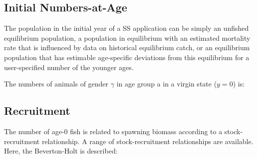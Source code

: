 \documentclass[11pt,
  english,
  letterpaper,
]{article}
\begin{document}
\leavevmode\tagmcend\tagstructend\par


\hypertarget{initial-numbers-at-age}{%
\subsection{Initial Numbers-at-Age}\label{initial-numbers-at-age}}

\leavevmode\tagmcend\tagstructend


The population in the initial year of a SS application can be simply an unfished equilibrium population, a population in equilibrium with an estimated mortality rate that is influenced by data on historical equilibrium catch, or an equilibrium population that has estimable age-specific deviations from this equilibrium for a user-specified number of the younger ages.

\leavevmode\tagmcend\tagstructend\par


The numbers of animals of gender {\(\gamma\)\leavevmode\tagmcend\tagstructend} in age group a in a virgin state ({\(y=0\)\leavevmode\tagmcend\tagstructend}) is:

\leavevmode\tagmcend\tagstructend\par


\hypertarget{recruitment}{%
\subsection{Recruitment}\label{recruitment}}

\leavevmode\tagmcend\tagstructend


The number of age-0 fish is related to spawning biomass according to a stock-recruitment relationship. A range of stock-recruitment relationships are available. Here, the Beverton-Holt is described:

\leavevmode\tagmcend\tagstructend\par

\end{document}
